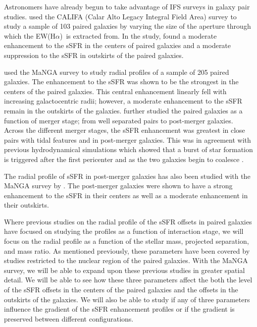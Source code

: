 \documentclass[iop,revtex4,twocolumn,apj,numberedappendix,appendixfloats]{emulateapj}
\newcommand{\ewha}{EW(H$\alpha$)}
\begin{document}
Astronomers have already begun to take advantage of IFS surveys in galaxy pair studies. \citet{Barrera-Ballesteros:2015} used the CALIFA (Calar Alto Legacy Integral Field Area) survey to study a sample of 103 paired galaxies by varying the size of the aperture through which the \ewha\ is extracted from. In the study, \citet{Barrera-Ballesteros:2015} found a moderate enhancement to the sSFR in the centers of paired galaxies and a moderate suppression to the sSFR in outskirts of the paired galaxies. 

\citet{Pan:2019} used the MaNGA survey to study radial profiles of a sample of 205 paired galaxies. The enhancement to the sSFR was shown to be the strongest in the centers of the paired galaxies. This central enhancement linearly fell with increasing galactocentric radii; however, a moderate enhancement to the sSFR remain in the outskirts of the galaxies. \citet{Pan:2019} further studied the paired galaxies as a function of merger stage; from well separated pairs to post-merger galaxies. Across the different merger stages, the sSFR enhancement was greatest in close pairs with tidal features and in post-merger galaxies. This was in agreement with previous hydrodynamical simulations which showed that a burst of star formation is triggered after the first pericenter and as the two galaxies begin to coalesce \citep{Scudder:2012}. 

The radial profile of sSFR in post-merger galaxies has also been studied with the MaNGA survey by \citet{Thorp:2019}. The post-merger galaxies were shown to have a strong enhancement to the sSFR in their centers as well as a moderate enhancement in their outskirts. 

Where previous studies on the radial profile of the sSFR offsets in paired galaxies have focused on studying the profiles as a function of interaction stage, we will focus on the radial profile as a function of the stellar mass, projected separation, and mass ratio. As mentioned previously, these parameters have been covered by studies restricted to the nuclear region of the paired galaxies. With the MaNGA survey, we will be able to expand upon these previous studies in greater spatial detail. We will be able to see how these three parameters affect the both the level of the sSFR offsets in the centers of the paired galaxies and the offsets in the outskirts of the galaxies. We will also be able to study if any of three parameters influence the gradient of the sSFR enhancement profiles or if the gradient is preserved between different configurations. 
\end{document}
